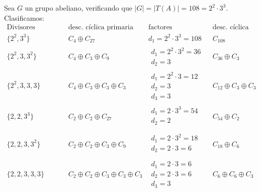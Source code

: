 \documentclass[12pt]{article}
\begin{document}
\begin{ejercicio}[2 puntos]
\begin{enumerate}[label=(\alph*)]
            Sea $G$ un grupo abeliano, verificando que $|G| = |T(A)| = 108 = 2^2 \cdot 3^3$. Clasificamos:
            \begin{equation*}
                \begin{array}{c|c|c|c}
                    \text{Divisores elementales} & \text{desc. cíclica primaria} & \text{factores invariantes} & \text{desc. cíclica} \\
                    \hline
                    \{2^2, 3^3\} & C_4 \oplus C_{27} & d_1= 2^2\cdot 3^3 = 108 & C_{108} \\
                    \hline
                    \{2^2,3,3^2\} & C_4\oplus C_3\oplus C_9 & \begin{array}{c}
                            d_1 = 2^2 \cdot 3^2 = 36 \\
                            d_2 = 3
                    \end{array}& C_{36}\oplus C_3 \\
                    \hline
                    \{2^2, 3, 3, 3\} & C_4\oplus C_3\oplus C_3\oplus C_3 & \begin{array}{c}
                            d_1 = 2^2 \cdot 3 = 12 \\
                            d_2 = 3 \\
                            d_3 = 3
                    \end{array}& C_{12} \oplus C_3 \oplus C_3 \\
                    \hline
                    \{2, 2, 3^3\} & C_2\oplus C_2\oplus C_{27} & \begin{array}{c}
                            d_1 = 2 \cdot 3^3 = 54 \\
                            d_2 = 2 \\
                    \end{array}& C_{54} \oplus C_2 \\
                    \hline
                    \{2, 2, 3, 3^2\} & C_2\oplus C_2\oplus C_{3} \oplus C_{9} & \begin{array}{c}
                            d_1 = 2 \cdot 3^2 = 18 \\
                            d_2 = 2 \cdot 3 = 6 \\
                    \end{array}& C_{18} \oplus C_6 \\
                    \hline
                    \{2, 2, 3, 3, 3\} & C_2\oplus C_2\oplus C_{3} \oplus C_{3} \oplus C_3 & \begin{array}{c}
                            d_1 = 2 \cdot 3 = 6 \\
                            d_2 = 2 \cdot 3 = 6 \\
                            d_3 = 3
                    \end{array}& C_{6} \oplus C_6 \oplus C_3 \\
                \end{array}
            \end{equation*}


\end{enumerate}
\end{ejercicio}
\end{document}

